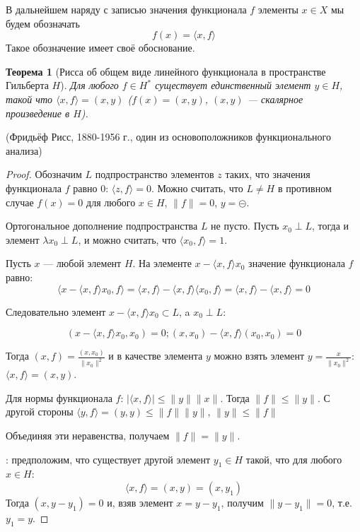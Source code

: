 \documentclass[12pt,a4paper,titlepage,oneside]{book}
\theoremstyle{definition}
\theoremstyle{plain}
\newtheorem*{theorem}{Теорема}
\theoremstyle{remark}
\theoremstyle{remark}
\theoremstyle{remark}
\theoremstyle{remark}
\theoremstyle{plain}
\theoremstyle{plain}
\begin{document}
В дальнейшем наряду с записью значения функционала $f$ элементы $x \in X$ мы будем обозначать
\begin{equation*}
f(x) =  \langle x, f \rangle 
\end{equation*}
Такое обозначение имеет своё обоснование.
\begin{theorem}[Рисса об общем виде линейного функционала в пространстве Гильберта $H$]
Для любого $f \in H^*$ существует единственный элемент $y \in H$, такой что $ \langle x, f \rangle =(x,y)$ ($f(x)=(x,y)$, $(x,y)$ --- скалярное произведение в $H$).
\end{theorem}

(Фридьёф Рисс, 1880-1956 г., один из основоположников функционального анализа)

\begin{proof}
Обозначим $L$ подпространство элементов $z$ таких, что значения функционала $f$ равно 0: $ \langle z, f \rangle =0$. Можно считать, что $L\ne H$ в противном случае $f(x)=0$ для любого $x\in H$, $\lVert f\rVert = 0$, $y=\circleddash$.

Ортогональное дополнение подпространства $L$ не пусто. Пусть $x_0\perp L$, тогда и элемент $\lambda x_0\perp L$, и можно считать, что $ \langle x_0, f \rangle =1$.

Пусть $x$ --- любой элемент $H$. На элементе $x- \langle x, f \rangle x_0$ значение функционала $f$ равно:
\begin{equation*}
 \langle x- \langle x, f \rangle x_0, f \rangle  =  \langle x, f \rangle - \langle x, f \rangle  \langle x_0, f \rangle  =  \langle x, f \rangle - \langle x, f \rangle  = 0
\end{equation*}

Следовательно элемент $x- \langle x, f \rangle x_0 \subset L$, a $x_0\perp L$:

\begin{equation*}
(x- \langle x, f \rangle x_0, x_0) = 0; (x, x_0) -  \langle x, f \rangle (x_0, x_0) = 0
\end{equation*}

Тогда $(x, f) = \frac{(x, x_0)}{\lVert x_0\rVert^2}$ и в качестве элемента $y$ можно взять элемент $y=\frac{x}{\lVert x_0\rVert^2}$:$ \langle x, f \rangle  = (x, y)$.

Для нормы функционала $f$: $\lvert  \langle x, f \rangle \rvert \leqslant \lVert y\rVert\lVert x\rVert$. Тогда $\lVert f\rVert \leqslant \lVert y\rVert$. С другой стороны $ \langle y, f \rangle  = (y, y) \leqslant \lVert f\rVert\lVert y\rVert$, $\lVert y\rVert\le\lVert f\rVert$

Объединяя эти неравенства, получаем $\lVert f\rVert = \lVert y\rVert$.

: предположим, что существует другой элемент $y_1 \in H$ такой, что для любого $x\in H$:
\begin{equation*}
 \langle x, f \rangle  = (x, y) = (x, y_1)
\end{equation*}
Тогда $(x, y-y_1) = 0$ и, взяв элемент $x = y-y_1$, получим $\lVert y-y_1\rVert = 0$, т.е. $y_1 = y$.
\end{proof}
\end{document}
